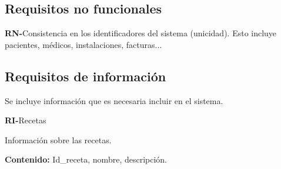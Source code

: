 \documentclass[11pt,a4paper]{article}
\newcounter{RNCounter}
\newcommand{\rn}[1]{\addtocounter{RNCounter}{1}\textbf{\rmfamily RN-\theRNCounter}\quad#1\\}
\newcounter{RICounter}
\newenvironment{rienv}[1]
	{\addtocounter{RICounter}{1}\textbf{\rmfamily RI-\theRICounter}\quad#1\begin{adjustwidth}{1em}{0em}}
	{\end{adjustwidth}}
\begin{document}
\subsection{Requisitos no funcionales}
  \rn{Consistencia en los identificadores del sistema (unicidad). Esto incluye pacientes, médicos, instalaciones, facturas...}


\subsection{Requisitos de información}

Se incluye información que es necesaria incluir en el sistema.


\begin{rienv}{Recetas}
	Información sobre las recetas.

  	\textbf{Contenido:} Id\_receta, nombre, descripción.
\end{rienv}
  

	
\end{document}
